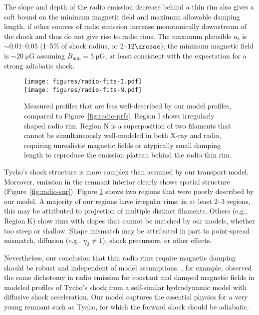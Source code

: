 \documentclass[manuscript]{aastex}  %
\newcommand*{\mt}{\mathrm}
\newcommand*{\unit}[1]{\;\mt{#1}}  %
\newcommand*{\abt}{\mathord{\sim}} %
\newcommand*{\Bmin}{B_{\mt{min}}}
\newcommand*{\muG}{\unit{\mu G}}
\begin{document}

The slope and depth of the radio emission decrease behind a thin rim also
gives a soft bound on the minimum magnetic field and maximum allowable damping
length, if other sources of radio emission increase monotonically downstream of
the shock and thus do not give rise to radio rims.  The maximum plausible $a_b$
is $\abt 0.01$--$0.05$ (1--5\% of shock radius, or $2$--$12\arcsec$); the
minimum magnetic field is $\abt 20 \muG$ assuming $\Bmin = 5 \muG$, at least
consistent with the expectation for a strong adiabatic shock.

\begin{figure}
    \centering
    \texttt{[image: figures/radio-fits-I.pdf]} \\
    \texttt{[image: figures/radio-fits-N.pdf]}
    \caption{Measured profiles that are less well-described by our model
    profiles, compared to Figure~\ref{fig:radio-prfs}.  Region I shows
    irregularly shaped radio rim.  Region N is a superposition of two filaments
    that cannot be simultaneously well-modeled in both X-ray and radio,
    requiring unrealistic magnetic fields or atypically small damping length to
    reproduce the emission plateau behind the radio thin rim.
    \label{fig:radio-prfs-meh}}
\end{figure}

Tycho's shock structure is more complex than assumed by our transport model.
Moreover, emission in the remnant interior clearly shows spatial structure
(Figure~\ref{fig:radio-snr}).  Figure \ref{fig:radio-prfs-meh} shows two
regions that were poorly described by our model.  A majority of our regions
have irregular rims; in at least 2--3 regions, this may be attributed to
projection of multiple distinct filaments.  Others (e.g., Region K) show rims
with slopes that cannot be matched by our models, whether too steep or
shallow.  Shape mismatch may be attributed in part to point-spread mismatch,
diffusion (e.g., $\eta_2 \neq 1$), shock precursors, or other effects.

Nevertheless, our conclusion that thin radio rims require magnetic damping
should be robust and independent of model assumptions.
\citet{cassam-chenai2007}, for example, observed the same dichotomy in radio
emission for constant and damped magnetic fields in modeled profiles of Tycho's
shock from a self-similar hydrodynamic model with diffusive shock acceleration.
Our model captures the essential physics for a very young remnant such as
Tycho, for which the forward shock should be adiabatic.
\end{document}
